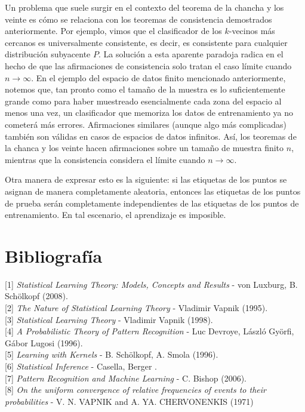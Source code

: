 \documentclass{article}
\begin{document}
Un problema que suele surgir en el contexto del teorema de la chancha y los veinte es cómo se relaciona con los 
teoremas de consistencia demostrados anteriormente. Por ejemplo, vimos que el clasificador 
de los \(k\)-vecinos más cercanos es universalmente consistente, es decir, es consistente para cualquier 
distribución subyacente \(P\). La solución a esta aparente paradoja radica en el hecho de que las afirmaciones de consistencia solo tratan 
el caso límite cuando \(n \to \infty\). En el ejemplo del espacio de datos finito mencionado anteriormente, 
notemos que, tan pronto como el tamaño de la muestra es lo suficientemente grande como para haber muestreado 
esencialmente cada zona del espacio al menos una vez, un clasificador que memoriza los datos de entrenamiento 
ya no cometerá más errores. Afirmaciones similares (aunque algo más complicadas) también son válidas en casos 
de espacios de datos infinitos. Así, los teoremas de la chanca y los veinte hacen afirmaciones sobre un tamaño de muestra finito \(n\), mientras que 
la consistencia considera el límite cuando \(n \to \infty\).\newline

Otra manera de expresar esto es la siguiente: si las etiquetas de los puntos se asignan de manera 
completamente aleatoria, entonces las etiquetas de los puntos de prueba serán completamente independientes 
de las etiquetas de los puntos de entrenamiento. En tal escenario, el aprendizaje es imposible.\newline

\bigbreak
\pagebreak
\section{Bibliografía}

[1] \textit{Statistical Learning Theory: Models, Concepts and Results} - von Luxburg, B. Schölkopf (2008). \\

[2] \textit{The Nature of Statistical Learning Theory} - Vladimir Vapnik (1995). \\

[3] \textit{Statistical Learning Theory} - Vladimir Vapnik (1998). \\

[4] \textit{A Probabilistic Theory of Pattern Recognition} - Luc Devroye, László Györfi, Gábor Lugosi (1996). \\

[5] \textit{Learning with Kernels} - B. Schölkopf, A. Smola (1996). \\

[6] \textit{Statistical Inference} - Casella, Berger . \\

[7] \textit{Pattern Recognition and Machine Learning} - C. Bishop (2006). \\

[8] \textit{On the uniform convergence of relative frequencies of events to their probabilities} - V. N. VAPNIK and A. YA. CHERVONENKIS (1971)
\end{document}
